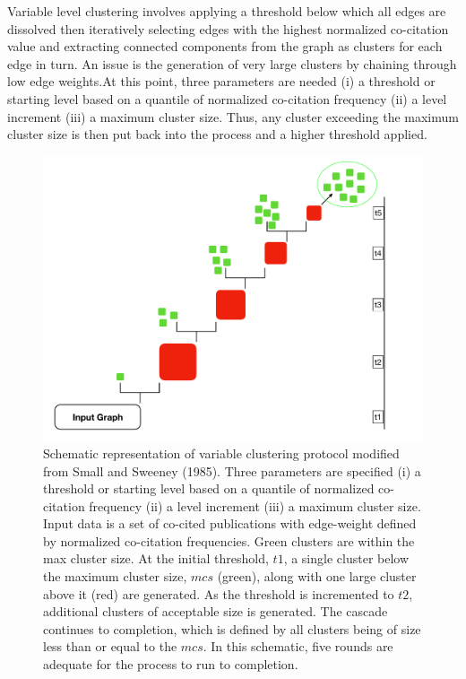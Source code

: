Variable level clustering involves applying a threshold below which all edges are dissolved then iteratively selecting edges with the highest normalized co-citation value and extracting connected components from the graph as clusters for each edge in turn. An issue is the generation of very large clusters by chaining through low edge weights.At this point, three parameters are needed (i) a threshold or starting level based on a quantile of normalized co-citation frequency (ii) a level increment (iii) a maximum cluster size. Thus, any cluster exceeding the maximum cluster size is then put back into the process and a higher threshold applied. 
\begin{figure}[ht]
  \includegraphics[scale=0.2]{vlc.pdf}
\caption{Schematic representation of variable clustering protocol modified from Small and Sweeney (1985). Three parameters are specified (i) a threshold or starting level based on a quantile of normalized co-citation frequency (ii) a level increment (iii) a maximum cluster size. Input data is a set of co-cited publications with edge-weight defined by normalized co-citation frequencies. Green clusters are within the max cluster size. At the initial threshold, $t1$, a single cluster below the maximum cluster size, $mcs$ (green), along with one large cluster above it (red) are generated. As the threshold is incremented to $t2$, additional clusters of acceptable size is generated. The cascade continues to completion, which is defined by all clusters being of size less than or equal to the $mcs$. In this schematic, five rounds are adequate for the process to run to completion.}
\label{vlc_process}       %
\end{figure}

